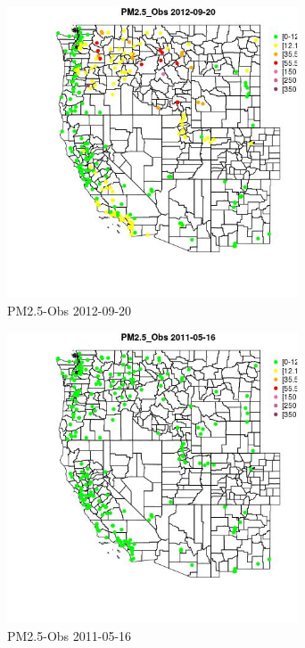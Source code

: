 \begin{figure} 
\centering  
\includegraphics[width=0.77\textwidth]{Code_Outputs/ML_input_report_ML_input_PM25_Step5_part_d_de_duplicated_aves_ML_input_MapObsPM25_Obs2012-09-20.jpg} 
\caption{\label{fig:ML_input_report_ML_input_PM25_Step5_part_d_de_duplicated_aves_ML_inputMapObsPM25_Obs2012-09-20}PM2.5-Obs 2012-09-20} 
\end{figure} 
 

\begin{figure} 
\centering  
\includegraphics[width=0.77\textwidth]{Code_Outputs/ML_input_report_ML_input_PM25_Step5_part_d_de_duplicated_aves_ML_input_MapObsPM25_Obs2011-05-16.jpg} 
\caption{\label{fig:ML_input_report_ML_input_PM25_Step5_part_d_de_duplicated_aves_ML_inputMapObsPM25_Obs2011-05-16}PM2.5-Obs 2011-05-16} 
\end{figure} 
 

